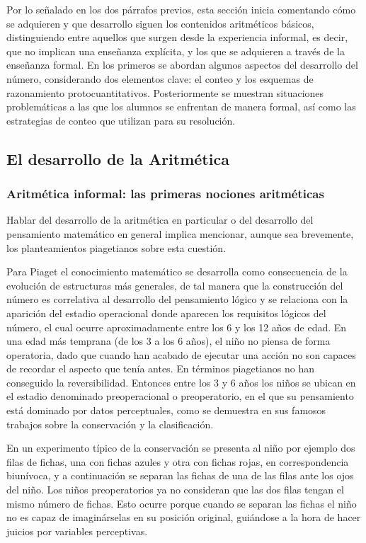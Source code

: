 \documentclass{article}
\begin{document}
Por lo señalado en los dos párrafos previos, esta sección inicia comentando cómo se adquieren y que desarrollo siguen los contenidos aritméticos básicos, distinguiendo entre aquellos que surgen desde la experiencia informal, es decir, que no implican una enseñanza explícita, y los que se adquieren a través de la enseñanza formal. En los primeros se abordan algunos aspectos del desarrollo del número, considerando dos elementos clave: el conteo y los esquemas de razonamiento protocuantitativos. Posteriormente se muestran situaciones problemáticas a las que los alumnos se enfrentan de manera formal, así como las estrategias de conteo que utilizan para su resolución.
\subsection{El desarrollo de la Aritmética }
\subsubsection{Aritmética informal: las primeras nociones aritméticas}
Hablar del desarrollo de la aritmética en particular o del desarrollo del pensamiento matemático en general implica mencionar, aunque sea brevemente, los planteamientos piagetianos sobre esta cuestión.

Para Piaget \cite{piaget2015psicologia} el conocimiento matemático se desarrolla como consecuencia de la evolución de estructuras más generales, de tal manera que la construcción del número es correlativa al desarrollo del pensamiento lógico y se relaciona con la aparición del estadio operacional donde aparecen los requisitos lógicos del número, el cual ocurre aproximadamente entre los 6 y los 12 años de edad. En una edad más temprana (de los 3 a los 6 años), el niño no piensa de forma operatoria, dado que cuando han acabado de ejecutar una acción no son capaces de recordar el aspecto que tenía antes. En términos piagetianos no han conseguido la reversibilidad. Entonces entre los 3 y 6 años los niños se ubican en el estadio denominado preoperacional o preoperatorio, en el que su pensamiento está dominado por datos perceptuales, como se demuestra en sus famosos trabajos sobre la conservación y la clasificación. 

En un experimento típico de la conservación se presenta al niño por ejemplo dos filas de fichas, una con fichas azules y otra con fichas rojas, en correspondencia biunívoca, y a continuación se separan las fichas de una de las filas ante los ojos del niño. Los niños preoperatorios ya no consideran que las dos filas tengan el mismo número de fichas. Esto ocurre porque cuando se separan las fichas el niño no es capaz de imaginárselas en su posición original, guiándose a la hora de hacer juicios por variables perceptivas.
\end{document}
